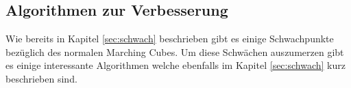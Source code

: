 \subsection{Algorithmen zur Verbesserung} 
Wie bereits in Kapitel \ref{sec:schwach} beschrieben gibt es einige Schwachpunkte bezüglich des normalen Marching Cubes. Um diese Schwächen auszumerzen gibt es einige interessante Algorithmen welche ebenfalls im Kapitel \ref{sec:schwach} kurz beschrieben sind. 